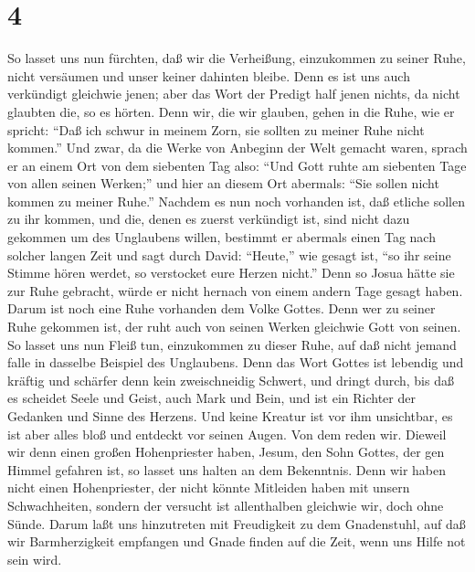 \hypertarget{section-3}{%
\section{4}\label{section-3}}

 So lasset uns nun fürchten, daß wir die Verheißung,
einzukommen zu seiner Ruhe, nicht versäumen und unser keiner dahinten
bleibe.  Denn es ist uns auch verkündigt gleichwie jenen;
aber das Wort der Predigt half jenen nichts, da nicht glaubten die, so
es hörten.  Denn wir, die wir glauben, gehen in die Ruhe,
wie er spricht: ``Daß ich schwur in meinem Zorn, sie sollten zu meiner
Ruhe nicht kommen.'' Und zwar, da die Werke von Anbeginn der Welt
gemacht waren,  sprach er an einem Ort von dem siebenten Tag
also: ``Und Gott ruhte am siebenten Tage von allen seinen Werken;''
 und hier an diesem Ort abermals: ``Sie sollen nicht kommen
zu meiner Ruhe.''  Nachdem es nun noch vorhanden ist, daß
etliche sollen zu ihr kommen, und die, denen es zuerst verkündigt ist,
sind nicht dazu gekommen um des Unglaubens willen,  bestimmt
er abermals einen Tag nach solcher langen Zeit und sagt durch David:
``Heute,'' wie gesagt ist, ``so ihr seine Stimme hören werdet, so
verstocket eure Herzen nicht.''  Denn so Josua hätte sie zur
Ruhe gebracht, würde er nicht hernach von einem andern Tage gesagt
haben.  Darum ist noch eine Ruhe vorhanden dem Volke Gottes.
 Denn wer zu seiner Ruhe gekommen ist, der ruht auch von
seinen Werken gleichwie Gott von seinen.  So lasset uns nun
Fleiß tun, einzukommen zu dieser Ruhe, auf daß nicht jemand falle in
dasselbe Beispiel des Unglaubens.  Denn das Wort Gottes ist
lebendig und kräftig und schärfer denn kein zweischneidig Schwert, und
dringt durch, bis daß es scheidet Seele und Geist, auch Mark und Bein,
und ist ein Richter der Gedanken und Sinne des Herzens. 
Und keine Kreatur ist vor ihm unsichtbar, es ist aber alles bloß und
entdeckt vor seinen Augen. Von dem reden wir.  Dieweil wir
denn einen großen Hohenpriester haben, Jesum, den Sohn Gottes, der gen
Himmel gefahren ist, so lasset uns halten an dem Bekenntnis.
 Denn wir haben nicht einen Hohenpriester, der nicht könnte
Mitleiden haben mit unsern Schwachheiten, sondern der versucht ist
allenthalben gleichwie wir, doch ohne Sünde.  Darum laßt
uns hinzutreten mit Freudigkeit zu dem Gnadenstuhl, auf daß wir
Barmherzigkeit empfangen und Gnade finden auf die Zeit, wenn uns Hilfe
not sein wird.

